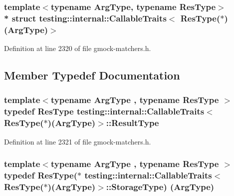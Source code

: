 \subsubsection*{template$<$typename Arg\+Type, typename Res\+Type$>$\\*
struct testing\+::internal\+::\+Callable\+Traits$<$ Res\+Type($\ast$)(\+Arg\+Type)$>$}



Definition at line 2320 of file gmock-\/matchers.\+h.



\subsection{Member Typedef Documentation}
\subsubsection[{\texorpdfstring{Result\+Type}{ResultType}}]{\setlength{\rightskip}{0pt plus 5cm}template$<$typename Arg\+Type , typename Res\+Type $>$ typedef Res\+Type {\bf testing\+::internal\+::\+Callable\+Traits}$<$ Res\+Type($\ast$)(Arg\+Type)$>$\+::{\bf Result\+Type}}\hypertarget{structtesting_1_1internal_1_1_callable_traits_3_01_res_type_07_5_08_07_arg_type_08_4_a1959235d286e9c9bb57c1c1139a0cbd8}{}\label{structtesting_1_1internal_1_1_callable_traits_3_01_res_type_07_5_08_07_arg_type_08_4_a1959235d286e9c9bb57c1c1139a0cbd8}


Definition at line 2321 of file gmock-\/matchers.\+h.

\subsubsection[{\texorpdfstring{Storage\+Type}{StorageType}}]{\setlength{\rightskip}{0pt plus 5cm}template$<$typename Arg\+Type , typename Res\+Type $>$ typedef Res\+Type($\ast$ {\bf testing\+::internal\+::\+Callable\+Traits}$<$ Res\+Type($\ast$)(Arg\+Type)$>$\+::Storage\+Type) (Arg\+Type)}\hypertarget{structtesting_1_1internal_1_1_callable_traits_3_01_res_type_07_5_08_07_arg_type_08_4_a0ee48af3b40e5c5bcb48a78cdacf6d9c}{}\label{structtesting_1_1internal_1_1_callable_traits_3_01_res_type_07_5_08_07_arg_type_08_4_a0ee48af3b40e5c5bcb48a78cdacf6d9c}



